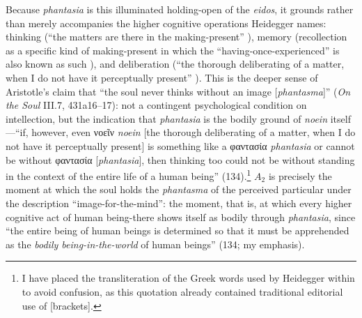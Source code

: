 \documentclass{article}
\newcommand{\gk}[1]{{\greekfont #1}}
\begin{document}
Because \textit{phantasia} is this illuminated holding-open of the \textit{eidos}, it grounds rather than merely accompanies the higher cognitive operations Heidegger names: thinking (``the matters are there in the making-present'' ), memory (recollection as a specific kind of making-present in which the ``having-once-experienced'' is also known as such ), and deliberation (``the thorough deliberating of a matter, when I do not have it perceptually present'' ). This is the deeper sense of Aristotle's claim that ``the soul never thinks without an image [\textit{phantasma}]'' (\textit{On the Soul} III.7, 431a16–17): not a contingent psychological condition on intellection, but the indication that \textit{phantasia} is the bodily ground of \textit{noein} itself---``if, however, even \gk{νοεῖν} {\textit{noein}} [the thorough deliberating of a matter, when I do not have it perceptually present] is something like a \gk{φαντασία} {\textit{phantasia}} or cannot be without \gk{φαντασία} [\textit{phantasia}], then thinking too could not be without standing in the context of the entire life of a human being'' (134).\footnote{I have placed the transliteration of the Greek words used by Heidegger within {} to avoid confusion, as this quotation already contained traditional editorial use of [brackets].} $A_2$ is precisely the moment at which the soul holds the \textit{phantasma} of the perceived particular under the description ``image-for-the-mind'': the moment, that is, at which every higher cognitive act of human being-there shows itself as bodily through \textit{phantasia}, since ``the entire being of human beings is determined so that it must be apprehended as the \textit{bodily being-in-the-world} of human beings'' (134; my emphasis).
\end{document}
